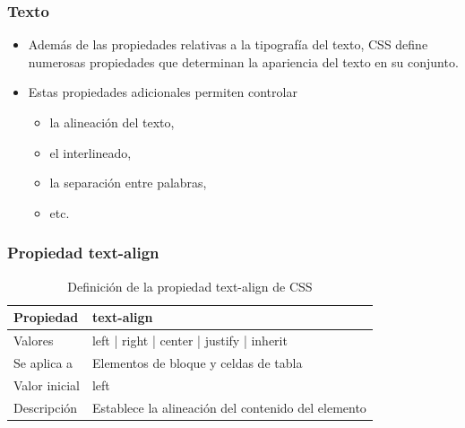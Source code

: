 
\begin{frame}
\frametitle{Texto}

\begin{itemize}
  \item Además de las propiedades relativas a la tipografía del texto, CSS define numerosas propiedades que determinan la apariencia del texto en su conjunto.
  \item Estas propiedades adicionales permiten controlar
  \begin{itemize}
    \item la alineación del texto,
    \item el interlineado,
    \item la separación entre palabras,
    \item etc.
  \end{itemize}
\end{itemize}

\end{frame}



\begin{frame}
\frametitle{Propiedad text-align}

\begin{center}
  \begin{table}
   \begin{tabular}{p{1.8cm}p{7.8cm}}
Propiedad & \bf{text-align} \\ \hline
Valores& left | right | center | justify | inherit \\ \hline
Se aplica a& Elementos de bloque y celdas de tabla \\ \hline
Valor inicial& left \\ \hline
Descripción& Establece la alineación del contenido del elemento \\ \hline
  \end{tabular}
   \caption{Definición de la propiedad text-align de CSS}
 \end{table}
\end{center}


\end{frame}



